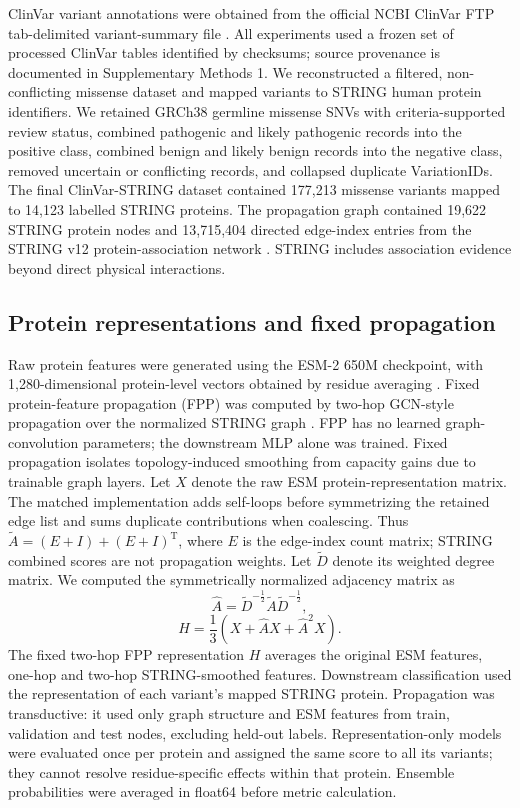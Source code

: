 \documentclass[conference]{IEEEtran}
\begin{document}
ClinVar variant annotations were obtained from the official NCBI ClinVar FTP tab-delimited variant-summary file \cite{Landrum2020ClinVar}. All experiments used a frozen set of processed ClinVar tables identified by checksums; source provenance is documented in Supplementary Methods 1. We reconstructed a filtered, non-conflicting missense dataset and mapped variants to STRING human protein identifiers. We retained GRCh38 germline missense SNVs with criteria-supported review status, combined pathogenic and likely pathogenic records into the positive class, combined benign and likely benign records into the negative class, removed uncertain or conflicting records, and collapsed duplicate VariationIDs. The final ClinVar-STRING dataset contained 177,213 missense variants mapped to 14,123 labelled STRING proteins. The propagation graph contained 19,622 STRING protein nodes and 13,715,404 directed edge-index entries from the STRING v12 protein-association network \cite{Szklarczyk2023STRING}. STRING includes association evidence beyond direct physical interactions.

\subsection{Protein representations and fixed propagation}

Raw protein features were generated using the ESM-2 650M checkpoint, with 1,280-dimensional protein-level vectors obtained by residue averaging \cite{Lin2023ESM}. Fixed protein-feature propagation (FPP) was computed by two-hop GCN-style propagation over the normalized STRING graph \cite{Kipf2017GCN}. FPP has no learned graph-convolution parameters; the downstream MLP alone was trained. Fixed propagation isolates topology-induced smoothing from capacity gains due to trainable graph layers. Let $X$ denote the raw ESM protein-representation matrix. The matched implementation adds self-loops before symmetrizing the retained edge list and sums duplicate contributions when coalescing. Thus $\tilde{A}=(E+I)+(E+I)^{\mathrm{T}}$, where $E$ is the edge-index count matrix; STRING combined scores are not propagation weights. Let $\tilde{D}$ denote its weighted degree matrix. We computed the symmetrically normalized adjacency matrix as
\begin{equation}
\hat{A}=\tilde{D}^{-\frac{1}{2}}\tilde{A}\tilde{D}^{-\frac{1}{2}},
\end{equation}
\begin{equation}
H=\frac{1}{3}\left(X+\hat{A}X+\hat{A}^{2}X\right).
\end{equation}
The fixed two-hop FPP representation $H$ averages the original ESM features, one-hop and two-hop STRING-smoothed features. Downstream classification used the representation of each variant's mapped STRING protein. Propagation was transductive: it used only graph structure and ESM features from train, validation and test nodes, excluding held-out labels. Representation-only models were evaluated once per protein and assigned the same score to all its variants; they cannot resolve residue-specific effects within that protein. Ensemble probabilities were averaged in float64 before metric calculation.
\end{document}
